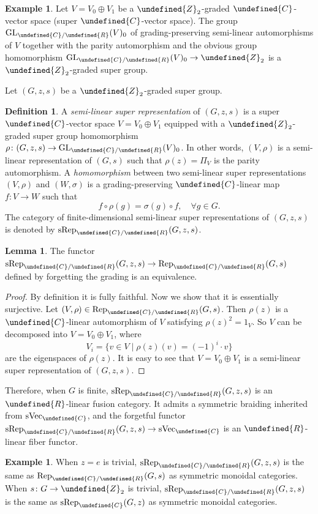 \documentclass[10pt]{article}
\let\mathbb\undefined
\theoremstyle{definition}
\newtheorem{lem}[thm]{Lemma}
\newtheorem{defn}[thm]{Definition}
\newtheorem{expl}[thm]{Example}
\numberwithin{equation}{section}
\numberwithin{thm}{section}
\newcommand{\pf}{\begin{proof}}
\newcommand{\epf}{\end{proof}}
\newcommand{\Cb}{\mathbb{C}}
\newcommand{\Rb}{\mathbb{R}}
\newcommand{\Zb}{\mathbb{Z}}
\newcommand{\svect}{\mathrm{sVec}}
\newcommand{\rep}{\mathrm{Rep}}
\newcommand{\srep}{\mathrm{sRep}}
\begin{document}
\begin{expl}
Let $V = V_0 \oplus V_1$ be a $\Zb_2$-graded $\Cb$-vector space (super $\Cb$-vector space). The group $\mathrm{GL}_{\Cb/\Rb}(V)_0$ of grading-preserving semi-linear automorphisms of $V$ together with the parity automorphism and the obvious group homomorphism $\mathrm{GL}_{\Cb/\Rb}(V)_0 \to \Zb_2$ is a $\Zb_2$-graded super group.
\end{expl}

Let $(G,z,s)$ be a $\Zb_2$-graded super group.

\begin{defn}
A \emph{semi-linear super representation} of $(G,z,s)$ is a super $\Cb$-vector space $V = V_0 \oplus V_1$ equipped with a $\Zb_2$-graded super group homomorphism $\rho \colon (G,z,s) \to \mathrm{GL}_{\Cb/\Rb}(V)_0$. In other words, $(V,\rho)$ is a semi-linear representation of $(G,s)$ such that $\rho(z) = \Pi_V$ is the parity automorphism. A \emph{homomorphism} between two semi-linear super representations $(V,\rho)$ and $(W,\sigma)$ is a grading-preserving $\Cb$-linear map $f \colon V \to W$ such that
\[
f \circ \rho(g) = \sigma(g) \circ f , \quad \forall g \in G .
\]
The category of finite-dimensional semi-linear super representations of $(G,z,s)$ is denoted by $\srep_{\Cb/\Rb}(G,z,s)$.
\end{defn}

\begin{lem}
The functor $\srep_{\Cb/\Rb}(G,z,s) \to \rep_{\Cb/\Rb}(G,s)$ defined by forgetting the grading is an equivalence.
\end{lem}

\pf
By definition it is fully faithful. Now we show that it is essentially surjective. Let $(V,\rho) \in \rep_{\Cb/\Rb}(G,s)$. Then $\rho(z)$ is a $\Cb$-linear automorphism of $V$ satisfying $\rho(z)^2 = 1_V$. So $V$ can be decomposed into $V = V_0 \oplus V_1$, where
\[
V_i = \{v \in V \mid \rho(z)(v) = (-1)^i \cdot v\}
\]
are the eigenspaces of $\rho(z)$. It is easy to see that $V = V_0 \oplus V_1$ is a semi-linear super representation of $(G,z,s)$.
\epf

Therefore, when $G$ is finite, $\srep_{\Cb/\Rb}(G,z,s)$ is an $\Rb$-linear fusion category. It admits a symmetric braiding inherited from $\svect_\Cb$, and the forgetful functor $\srep_{\Cb/\Rb}(G,z,s) \to \svect_\Cb$ is an $\Rb$-linear fiber functor.

\begin{expl}
When $z = e$ is trivial, $\srep_{\Cb/\Rb}(G,z,s)$ is the same as $\rep_{\Cb/\Rb}(G,s)$ as symmetric monoidal categories. When $s \colon G \to \Zb_2$ is trivial, $\srep_{\Cb/\Rb}(G,z,s)$ is the same as $\srep_\Cb(G,z)$ as symmetric monoidal categories.
\end{expl}
\end{document}
